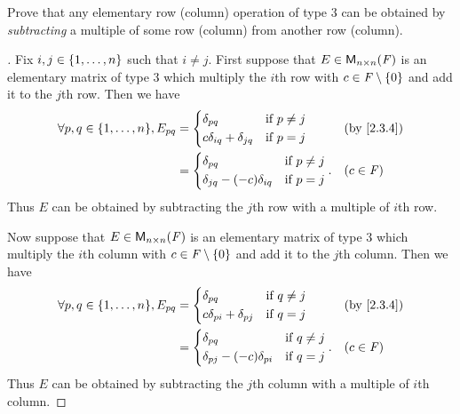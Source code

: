 \begin{ex}\label{ex:3.1.11}
	Prove that any elementary row (column) operation of type 3 can be obtained by \emph{subtracting} a multiple of some row (column) from another row (column).
\end{ex}

\begin{proof}[]
	Fix \(i, j \in \left\lbrace1, \dots, n\right\rbrace\) such that \(i \neq j\).
	First suppose that \(E \in \mathsf{M}_{{n} \times n}({\mathit{F}})\) is an elementary matrix of type 3 which multiply the \(i\)th row with \(c \in \mathit{F} \setminus \left\lbrace0\right\rbrace\) and add it to the \(j\)th row.
	Then we have
	\begin{align*}
		\forall p, q \in \set{1, \dots, n}, E_{p q} & = \begin{dcases}
			                                                \delta_{p q}                  & \text{if } p \neq j \\
			                                                c \delta_{i q} + \delta_{j q} & \text{if } p = j
		                                                \end{dcases}    &  & \by{2.3.4}    \\
		                                            & = \begin{dcases}
			                                                \delta_{p q}                     & \text{if } p \neq j \\
			                                                \delta_{j q} - (-c) \delta_{i q} & \text{if } p = j
		                                                \end{dcases}. &  & (c \in \F)
	\end{align*}
	Thus \(E\) can be obtained by subtracting the \(j\)th row with a multiple of \(i\)th row.

	Now suppose that \(E \in \mathsf{M}_{{n} \times n}({\mathit{F}})\) is an elementary matrix of type 3 which multiply the \(i\)th column with \(c \in \mathit{F} \setminus \left\lbrace0\right\rbrace\) and add it to the \(j\)th column.
	Then we have
	\begin{align*}
		\forall p, q \in \set{1, \dots, n}, E_{p q} & = \begin{dcases}
			                                                \delta_{p q}                  & \text{if } q \neq j \\
			                                                c \delta_{p i} + \delta_{p j} & \text{if } q = j
		                                                \end{dcases}    &  & \by{2.3.4}    \\
		                                            & = \begin{dcases}
			                                                \delta_{p q}                     & \text{if } q \neq j \\
			                                                \delta_{p j} - (-c) \delta_{p i} & \text{if } q = j
		                                                \end{dcases}. &  & (c \in \F)
	\end{align*}
	Thus \(E\) can be obtained by subtracting the \(j\)th column with a multiple of \(i\)th column.
\end{proof}

